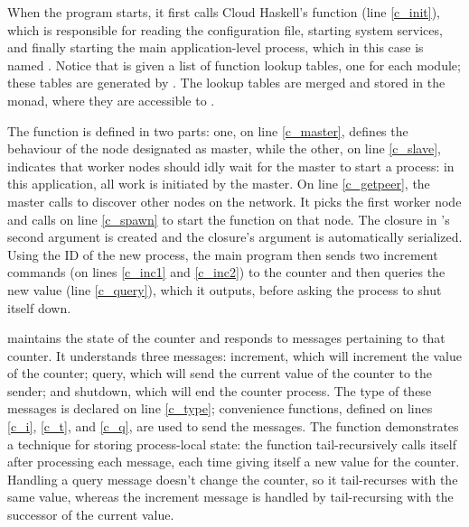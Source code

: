 \documentclass{sigplanconf}
\begin{document}
When the program starts, it first calls Cloud Haskell's 
function  (line \ref{c_init}), which is responsible for reading the configuration file, starting system services, and finally starting the main application-level process, which in this case is named .
Notice that  is given a list of function lookup tables, one for each module; these tables are generated by . 
The lookup tables are merged and stored in the  monad, where they are accessible to .

The  function is defined in two parts: one, on line \ref{c_master}, defines the behaviour of the node designated as master, while the other, on line \ref{c_slave}, indicates that worker nodes should idly wait for the master to start a process:
in this application, all work is initiated by the master. On line \ref{c_getpeer}, the master calls  to discover other nodes on the network. It picks the first worker node and calls  on line \ref{c_spawn} to start the  function on that node. The closure in 's second argument is created and the closure's argument is automatically serialized. %
Using the ID of the new process, the main program then sends two increment commands (on lines \ref{c_inc1} and \ref{c_inc2}) to the counter and then queries the new value (line \ref{c_query}), which it outputs, before asking the process to shut itself down.

 maintains the state of the counter and responds to messages pertaining to that counter. It understands three messages: increment, which will increment the value of the counter; query, which will send the current value of the counter to the sender; and shutdown, which will end the counter process. 
The type of these messages is declared on line \ref{c_type}; convenience functions, defined on lines \ref{c_i}, \ref{c_t}, and \ref{c_q}, are used to send the messages. The  function demonstrates a technique for storing process-local state: the function tail-recursively calls itself after processing each message, each time giving itself a new value for the counter. Handling a query message doesn't change the counter, so it tail-recurses with the same value, whereas the increment message is handled by tail-recursing with the successor of the current value.
\end{document}
